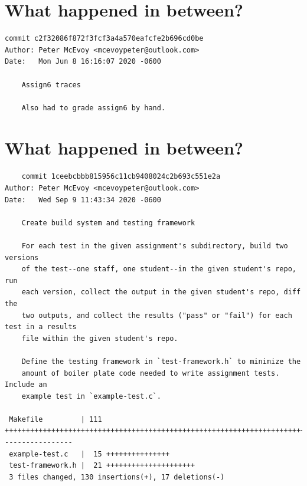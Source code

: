\documentclass{article}
\begin{document}
\newpage

\section*{What happened in between?}
\vspace{2ex}
\begin{verbatim}
commit c2f32086f872f3fcf3a4a570eafcfe2b696cd0be
Author: Peter McEvoy <mcevoypeter@outlook.com>
Date:   Mon Jun 8 16:16:07 2020 -0600

    Assign6 traces
    
    Also had to grade assign6 by hand.

\end{verbatim}

\newpage

\section*{What happened in between?}
\vspace{2ex}
\begin{verbatim}
    commit 1ceebcbbb815956c11cb9408024c2b693c551e2a
Author: Peter McEvoy <mcevoypeter@outlook.com>
Date:   Wed Sep 9 11:43:34 2020 -0600

    Create build system and testing framework
    
    For each test in the given assignment's subdirectory, build two versions
    of the test--one staff, one student--in the given student's repo, run
    each version, collect the output in the given student's repo, diff the
    two outputs, and collect the results ("pass" or "fail") for each test in a results
    file within the given student's repo.
    
    Define the testing framework in `test-framework.h` to minimize the
    amount of boiler plate code needed to write assignment tests. Include an
    example test in `example-test.c`.

 Makefile         | 111 ++++++++++++++++++++++++++++++++++++++++++++++++++++++++++++++++++++++++++++++++++++++++++++++-----------------
 example-test.c   |  15 +++++++++++++++
 test-framework.h |  21 +++++++++++++++++++++
 3 files changed, 130 insertions(+), 17 deletions(-)
\end{verbatim}

\newpage
\end{document}
